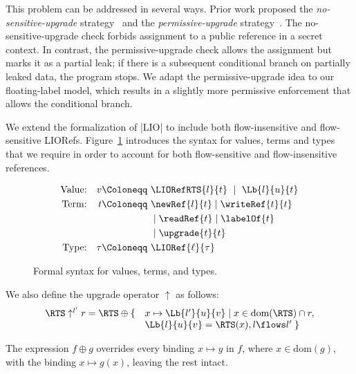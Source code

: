 This problem can be addressed in several ways. Prior work proposed the
\emph{no-sensitive-upgrade} strategy~\citep{?} and the
\emph{permissive-upgrade} strategy~\citep{?}. The no-sensitive-upgrade
check forbids assignment to a public reference in a secret context. In
contrast, the permissive-upgrade check allows the assignment but marks
it as a partial leak; if there is a subsequent conditional branch on
partially leaked data, the program stops. We adapt the
permissive-upgrade idea to our floating-label model, which results in
a slightly more permissive enforcement that allows the conditional
branch.

We extend the formalization of |LIO| to include both flow-insensitive
and flow-sensitive LIORefs. Figure~\ref{fig:fs-exts-syntax} introduces
the syntax for values, terms and types that we require in order to
account for both flow-sensitive and flow-insensitive references.

\begin{figure}[!ht] %
\vspace*{-5pt}
\begin{align*}
\textrm{Value:}   && v    \Coloneqq~ &
                                 \LIORefRTS{l}{t}
                           \ \mid\  \Lb{l}{u}{t} \\
\textrm{Term:}    && t    \Coloneqq~ &
                             \newRef{l}{t}
                           \mid  \writeRef{t}{t} \\
                  && &     \mid  \readRef{t}
                           \mid  \labelOf{t} \\
                  && &     \mid  \upgrade{t}{t} \\
\textrm{Type:}    && \tau \Coloneqq~& 
                          \LIORef{\ell}{\tau} \\
\end{align*}
\caption{Formal syntax for values, terms, and types.\label{fig:fs-exts-syntax}}
\vspace*{-5pt}
\end{figure} 

We also define the upgrade operator $\uparrow$ as follows:
\[
\begin{array}{ll}
\RTS\uparrow^{l'} r = \RTS \oplus \{ &x\mapsto \Lb{l'}{u}{v} \mid x \in \mbox{dom}(\RTS)\cap r, \\
 &\Lb{l}{u}{v} = \RTS(x), l\flows l'\; \}
\end{array}
\]

The expression $f\oplus g$ overrides every binding $x\mapsto y$ in $f$, where
$x\in \mbox{dom}(g)$, with the binding $x\mapsto g(x)$, leaving the rest intact.

